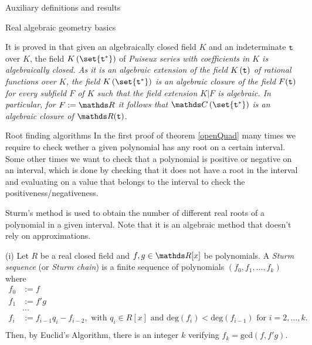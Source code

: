 \documentclass[11pt, a4paper, english, twoside, notitlepage, openright]{report}
\begin{document}
\begin{chapter}{Auxiliary definitions and results}
\begin{section}{Real algebraic geometry basics}
\begin{definition} \label{puiseux} It is proved in \cite[pp. 98-102]{w} that given an algebraically closed field $K$ and an indeterminate ${\tt t}$ over $K$, the field $K\left(\set{{\tt t}^*}\right)$ of \em Puiseux series \em with coefficients in $K$ is algebraically closed. As it is an algebraic extension of the field $K\left({\tt t}\right)$ of rational functions over $K$, the field $K\left(\set{{\tt t}^*}\right)$ is an algebraic closure of the field $F({\tt t})$ for every subfield $F$ of $K$ such that the field extension $K|F$ is algebraic. In particular, for $F:=\R$ it follows that $\C\left(\set{{\tt t}^*}\right)$ is an algebraic closure of $\R({\tt t})$.
\end{definition}
\end{section}

\begin{section}{Root finding algorithms}
In the first proof of theorem \ref{openQuad} many times we require to check wether a given polynomial has any root on a certain interval. Some other times we want to check that a polynomial is positive or negative on an interval, which is done by checking that it does not have a root in the interval and evaluating on a value that belongs to the interval to check the positiveness/negativeness.

Sturm's method is used to obtain the number of different real roots of a polynomial in a given interval. Note that it is an algebraic method that doesn't rely on approximations.

\begin{definitions}\label{sturmSeq} (i) Let $R$ be a real closed field and $f,g\in\R[x]$ be polynomials. A  \emph{Sturm sequence} (or \emph{Sturm chain}) is a finite sequence of polynomials $(f_0, f_1, \dots, f_k)$ where 
\begin{equation*}
\begin{aligned}
f_0 &:= f\\
f_1 &:= f'g\\
& \dots\\
f_i &:= f_{i-1}q_i - f_{i-2}, \text{ with } q_{i}\in R[x] \text{ and } \text{deg}(f_{i}) < \text{deg}(f_{i-1}) \text{ for } i = 2, \dots, k.\\
\end{aligned}
\end{equation*}
	Then, by Euclid's Algorithm, there is an integer $k$ verifying $f_k = \text{gcd}(f, f'g)$.
	

\end{definitions}
\end{section}
\end{chapter}
\end{document}
